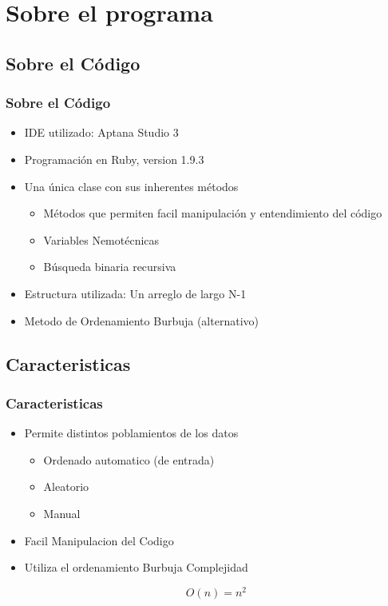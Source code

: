\documentclass{beamer}
\begin{document}
\section{Sobre el programa}

	\subsection{Sobre el Código}
	\begin{frame}
		\frametitle{Sobre el Código}
			\begin{itemize}[<+->]
				\item IDE utilizado: Aptana Studio 3
				\item Programación en Ruby, version 1.9.3
				\item Una única clase con sus inherentes métodos
				\begin{itemize}[<+->]
					\item Métodos que permiten facil manipulación y entendimiento del código
					\item Variables Nemotécnicas
					\item Búsqueda binaria recursiva
				\end{itemize}
				\item Estructura utilizada: Un arreglo de largo N-1
				\item Metodo de Ordenamiento Burbuja (alternativo)
			\end{itemize}
	\end{frame}

	\subsection{Caracteristicas}
	\begin{frame}
		\frametitle{Caracteristicas}
			\begin{itemize}[<+->]
				\item Permite distintos poblamientos de los datos
				\begin{itemize}[<+->]
					\item Ordenado automatico (de entrada)
					\item Aleatorio
					\item Manual
				\end{itemize}
				\item Facil Manipulacion del Codigo
				\item Utiliza el ordenamiento Burbuja Complejidad 
				\begin{center}
				\begin{equation} O(n) = n^2 \end{equation} 
				\end{center}
			\end{itemize}			
	\end{frame}
	
\end{document}
